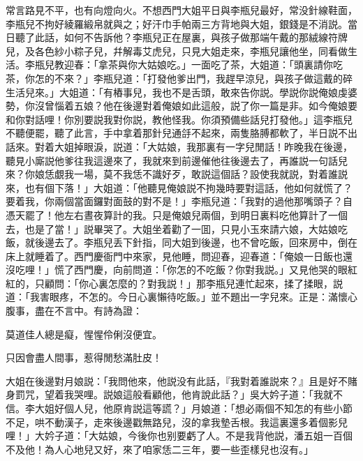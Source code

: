 常言路見不平，也有向燈向火。不想西門大姐平日與李瓶兒最好，常没針線鞋面，李瓶兒不拘好綾羅緞帛就與之；好汗巾手帕兩三方背地與大姐，銀錢是不消説。當日聽了此話，如何不告訴他？李瓶兒正在屋裏，與孩子做那端午戴的那絨線符牌兒，及各色紗小粽子兒，幷解毒艾虎兒，只見大姐走來，李瓶兒讓他坐，同看做生活。李瓶兒教迎春：「拿茶與你大姑娘吃。」一面吃了茶，大姐道：「頭裏請你吃茶，你怎的不來？」李瓶兒道：「打發他爹出門，我趕早涼兒，與孩子做這戴的碎生活兒來。」大姐道：「有樁事兒，我也不是舌頭，敢來告你説。學説你説俺娘虔婆勢，你沒曾惱着五娘？他在後邊對着俺娘如此這般，説了你一篇是非。如今俺娘要和你對話哩！你別要説我對你説，教他怪我。你須預備些話兒打發他。」這李瓶兒不聽便罷，聽了此言，手中拿着那針兒通㧱不起來，兩隻胳膊都軟了，半日説不出話來。對着大姐掉眼淚，説道：「大姑娘，我那裏有一字兒閒話！昨晚我在後邊，聽見小廝説他爹往我這邊來了，我就來到前邊催他往後邊去了，再誰説一句話兒來？你娘恁覷我一場，莫不我恁不識好歹，敢説這個話？設使我就説，對着誰説來，也有個下落！」大姐道：「他聽見俺娘説不拘幾時要對這話，他如何就慌了？要着我，你兩個當面鑼對面鼓的對不是！」李瓶兒道：「我對的過他那嘴頭子？自憑天罷了！他左右晝夜算計的我。只是俺娘兒兩個，到明日裏料吃他算計了一個去，也是了當！」説畢哭了。大姐坐着勸了一囬，只見小玉來請六娘，大姑娘吃飯，就後邊去了。李瓶兒丢下針指，同大姐到後邊，也不曾吃飯，回來房中，倒在床上就睡着了。西門慶衙門中來家，見他睡，問迎春，迎春道：「俺娘一日飯也還沒吃哩！」慌了西門慶，向前問道：「你怎的不吃飯？你對我説。」又見他哭的眼紅紅的，只顧問：「你心裏怎麼的？對我説！」那李瓶兒連忙起來，揉了揉眼，説道：「我害眼疼，不怎的。今日心裏懶待吃飯。」並不題出一字兒來。正是：滿懷心腹事，盡在不言中。有詩為證：

\begin{myquote}
莫道佳人總是癡，惺惺伶俐沒便宜。

只因會盡人間事，惹得閒愁滿肚皮！
\end{myquote}

大姐在後邊對月娘説：「我問他來，他説没有此話，『我對着誰説來？』且是好不賭身罰咒，望着我哭哩。説娘這般看顧他，他肯說此話？」吳大妗子道：「我就不信。李大姐好個人兒，他原肯説這等謊？」月娘道：「想必兩個不知怎的有些小節不足，哄不動漢子，走來後邊戳無路兒，沒的拿我墊舌根。我這裏還多着個影兒哩！」大妗子道：「大姑娘，今後你也别要虧了人。不是我背他説，潘五姐一百個不及他！為人心地兒又好，來了咱家恁二三年，要一些歪樣兒也沒有。」

